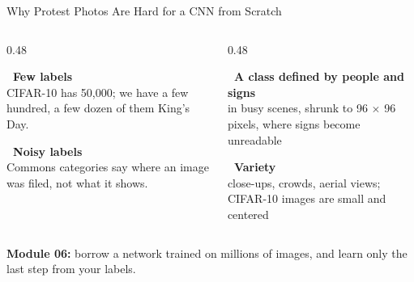 \begin{frame}{Why Protest Photos Are Hard for a CNN from Scratch}
\begin{columns}[T]
\begin{column}{0.48\textwidth}
\begin{greenbox}
\textbf{\faTags\ Few labels}\\
CIFAR-10 has 50,000; we have a few hundred, a few dozen of them King's Day.
\end{greenbox}
\begin{greenbox}
\textbf{\faFolderOpen\ Noisy labels}\\
Commons categories say where an image was filed, not what it shows.
\end{greenbox}
\end{column}
\begin{column}{0.48\textwidth}
\begin{greenbox}
\textbf{\faUsers\ A class defined by people and signs}\\
in busy scenes, shrunk to 96 $\times$ 96 pixels, where signs become unreadable
\end{greenbox}
\begin{greenbox}
\textbf{\faImages\ Variety}\\
close-ups, crowds, aerial views; CIFAR-10 images are small and centered
\end{greenbox}
\end{column}
\end{columns}
\begin{navybox}
\textbf{Module 06:} borrow a network trained on millions of images, and learn only the last step
from your labels.
\end{navybox}
\end{frame}



